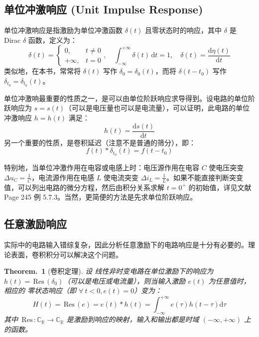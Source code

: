 \documentclass[UTF8]{report}
\def\Res{\,\mathrm{Res}\,}
\def\R{\mathbb{R}}
\def\C{\mathbb{C}}
\theoremstyle{MyLineTheoremStyle} %
\theoremstyle{MyBlockTheoremStyle} %
\newtheorem{BlockTheorem}[LineTheorem]{Theorem.\,} %
\theoremstyle{MySubsubsectionStyle} %
\begin{document}
\subsection{单位冲激响应 (Unit Impulse Response)}
单位冲激响应是指激励为单位冲激函数 $\delta(t)$ 且零状态时的响应，其中 $\delta$ 是 Dirac $\delta$ 函数，定义为：
\begin{equation}
\delta(t) =
\begin{cases}
    0, & t \neq 0 \\
    +\infty, & t = 0
\end{cases},\quad \int_{-\infty}^{+\infty} \delta(t) \,\mathrm{d}t = 1,\quad \delta(t) = \frac{\mathrm{d} \eta(t)}{\mathrm{d} t}
\end{equation}
类似地，在本书，常常将 $\delta(t)$ 写作 $\delta_0 = \delta_0(t)$，而将 $\delta(t - t_0) $ 写作 $\delta_{t_0} = \delta_{t_0}(t)$。


单位冲激响最重要的性质之一，是可以由单位阶跃响应求导得到。设电路的单位阶跃响应为 $s = s(t)$（可以是电压量也可以是电流量），可以证明，此电路的单位冲激响应 $h = h(t)$ 满足：
\begin{equation}\label{for:单位冲激响应}
h(t) = \frac{\mathrm{d} s(t)}{\mathrm{d} t}
\end{equation}
另一个重要的性质，是卷积延迟（注意不是普通的筛分），即：
\begin{equation}
f(t)*\delta_{t_0}(t) = f(t - t_0)
\end{equation}


特别地，当单位冲激作用在电容或电感上时：电压源作用在电容 $C$ 使电压突变 $\Delta u_C = \frac{1}{C}$，电流源作用在电感 $L$ 使电流突变 $\Delta i_L = \frac{1}{L}$。如果不能直接判断突变值，可以列出电路的微分方程，然后由积分关系求解 $t = 0^+$ 的初始值，详见文献 \cite{电路原理习题集} Page 245 例 5.7.3。当然，更简便的方法是先求单位阶跃响应。



\subsection{任意激励响应}
实际中的电路输入错综复杂，因此分析任意激励下的电路响应是十分有必要的。理论表面，卷积积分可以解决这个问题。

\begin{BlockTheorem}[卷积定理]\label{卷积定理}
设{\color{red} 线性}非时变电路在单位激励下的响应为 $h(t) = \Res(\delta_0)$（可以是电压或电流量），则当输入激励 $e(t)$ 为任意值时，相应的{\color{red} 零状态}响应（即 $\forall\ t < 0, e(t) = 0$）变为：
\begin{equation}
H(t) = \Res(e) = e(t)*h(t) = \int_{-\infty}^{+\infty} e(\tau)h(t - \tau)\mathrm{d}\tau 
\end{equation}
其中 $\Res: \C_{\R} \longrightarrow \C_{\R}$ 是激励到响应的映射，输入和输出都是时域 $(-\infty, +\infty)$ 上的函数。
\end{BlockTheorem}
\end{document}
